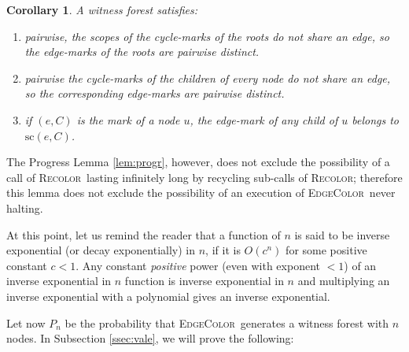\documentclass{amsart}
\theoremstyle{plain}
\newtheorem{definition}{Definition}
\newtheorem{corollary}{Corollary}
\newcommand{\EC}{\textsc{EdgeColor}}
\newcommand{\Recolor}{\textsc{Recolor}}
\newcommand{\sco}{\mathrm{sc}}
\begin{document}
\begin{corollary}\label{cor:witnessProp}
A witness forest satisfies:

\begin{enumerate}%
\item\label{ite:fir} pairwise,  the scopes of the cycle-marks of the roots   do not share an edge, so the edge-marks of the roots are pairwise distinct.
\item \label{ite:sec} pairwise the  cycle-marks of the children of every node do not share an edge, so the corresponding edge-marks are pairwise distinct.
\item \label{ite:thi} if $(e,C)$ is the mark of a node $u$, the edge-mark of any child of $u$ belongs to $\sco(e,C)$. 
\end{enumerate}
\end{corollary}

The Progress Lemma \ref{lem:progr}, however,  does not exclude  the possibility of  a call of \Recolor\  lasting infinitely long  by recycling  sub-calls of \Recolor;   therefore this lemma  does not exclude the possibility of an execution of \EC\ never halting. 

At this point, let us remind the reader that a function of $n$ is said to be inverse exponential  (or decay exponentially) in $n$, if it is $O(c^n)$ for some positive constant $c< 1$. Any constant {\em positive} power (even with exponent $<1$) of an inverse exponential in $n$ function is inverse exponential in $n$  and  multiplying an inverse exponential with a polynomial gives an inverse exponential.


  

Let now $P_n$ be the probability that \EC\ generates a witness forest with  $n$ nodes. In Subsection \ref{ssec:vale},
we will prove  the following:
\end{document}
